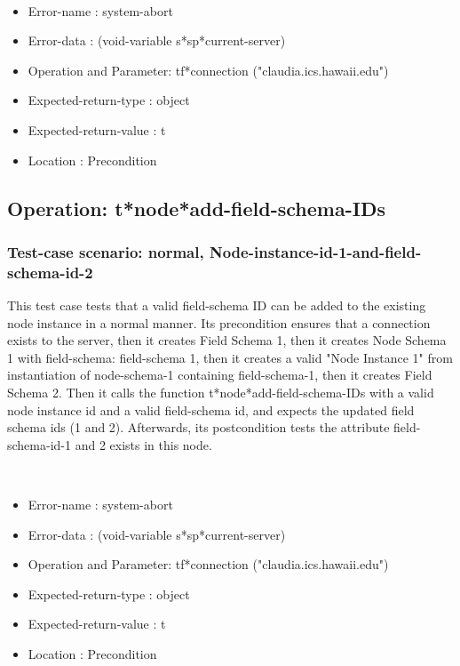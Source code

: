 \
\begin {itemize}
\item 	Error-name             : system-abort
\item Error-data             : (void-variable s*sp*current-server)
\item Operation and Parameter: tf*connection ("claudia.ics.hawaii.edu")
\item Expected-return-type   : object
\item Expected-return-value  : t
\item Location               : Precondition



\end {itemize}
\subsection {Operation: t*node*add-field-schema-IDs}
\subsubsection {Test-case scenario: normal, Node-instance-id-1-and-field-schema-id-2}


This test case tests that a valid field-schema ID can be added to the existing node instance in a normal manner.
Its precondition ensures that a connection exists to the server, then it creates Field Schema 1, then it creates Node Schema 1 with field-schema: field-schema 1, then it creates a valid "Node Instance 1" from instantiation of node-schema-1 containing field-schema-1, then it creates Field Schema 2.
Then it calls the function t*node*add-field-schema-IDs  with a valid node instance id and a valid field-schema id, and expects the updated field schema ids (1 and 2).
Afterwards, its postcondition tests the attribute field-schema-id-1 and 2 exists in this node.


\
\begin {itemize}
\item 	Error-name             : system-abort
\item Error-data             : (void-variable s*sp*current-server)
\item Operation and Parameter: tf*connection ("claudia.ics.hawaii.edu")
\item Expected-return-type   : object
\item Expected-return-value  : t
\item Location               : Precondition



\end {itemize}
